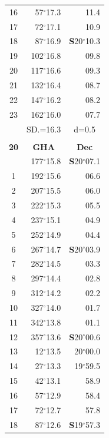 \documentclass[10pt, a4paper]{report}
\begin{document}
\begin{scriptsize}
\begin{tabular*}{0.2\textwidth}[t]{@{\extracolsep{\fill}}|c|rr|}
16 & 57$^\circ$17.3 & 11.4\\
17 & 72$^\circ$17.1 & 10.9\\[2Pt]
18 & 87$^\circ$16.9 & \textbf{S}20$^\circ$10.3\\
19 & 102$^\circ$16.8 & 09.8\\
20 & 117$^\circ$16.6 & 09.3\\
21 & 132$^\circ$16.4 & \raisebox{0.24ex}{\boldmath$\cdot$~\boldmath$\cdot$~~}08.7\\
22 & 147$^\circ$16.2 & 08.2\\
23 & 162$^\circ$16.0 & 07.7\\
\hline
\rule{0pt}{2.4ex} & \multicolumn{1}{c}{SD.=16.3} & \multicolumn{1}{c|}{d=0.5}\\
\hline
\multicolumn{1}{c}{}\\[-0.5ex]\hline
\multicolumn{1}{|c|}{\rule{0pt}{2.6ex}\textbf{20}} & \multicolumn{1}{c}{\textbf{GHA}} & \multicolumn{1}{c|}{\textbf{Dec}}\\
\hline\rule{0pt}{2.6ex}\noindent
0 & 177$^\circ$15.8 & \textbf{S}20$^\circ$07.1\\
1 & 192$^\circ$15.6 & 06.6\\
2 & 207$^\circ$15.5 & 06.0\\
3 & 222$^\circ$15.3 & \raisebox{0.24ex}{\boldmath$\cdot$~\boldmath$\cdot$~~}05.5\\
4 & 237$^\circ$15.1 & 04.9\\
5 & 252$^\circ$14.9 & 04.4\\[2Pt]
6 & 267$^\circ$14.7 & \textbf{S}20$^\circ$03.9\\
7 & 282$^\circ$14.5 & 03.3\\
8 & 297$^\circ$14.4 & 02.8\\
9 & 312$^\circ$14.2 & \raisebox{0.24ex}{\boldmath$\cdot$~\boldmath$\cdot$~~}02.2\\
10 & 327$^\circ$14.0 & 01.7\\
11 & 342$^\circ$13.8 & 01.1\\[2Pt]
12 & 357$^\circ$13.6 & \textbf{S}20$^\circ$00.6\\
13 & 12$^\circ$13.5 & 20$^\circ$00.0\\
14 & 27$^\circ$13.3 & 19$^\circ$59.5\\
15 & 42$^\circ$13.1 & \raisebox{0.24ex}{\boldmath$\cdot$~\boldmath$\cdot$~~}58.9\\
16 & 57$^\circ$12.9 & 58.4\\
17 & 72$^\circ$12.7 & 57.8\\[2Pt]
18 & 87$^\circ$12.6 & \textbf{S}19$^\circ$57.3\\

\end{tabular*}
\end{scriptsize}
\end{document}
